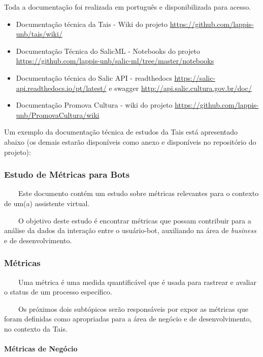 Toda a documentação foi realizada em português e disponibilizada para
acesso.

\begin{itemize}
\tightlist
\item
  Documentação técnica da Tais - Wiki do projeto
  \url{https://github.com/lappis-unb/tais/wiki/}
\item
  Documentação Técnica do SalicML - Notebooks do projeto
  \url{https://github.com/lappis-unb/salic-ml/tree/master/notebooks}
\item
  Documentação técnica do Salic API - readthedocs
  \url{https://salic-api.readthedocs.io/pt/latest/} e swagger
  \url{http://api.salic.cultura.gov.br/doc/}
\item
  Documentação Promova Cultura - wiki do projeto
  \url{https://github.com/lappis-unb/PromovaCultura/wiki}
\end{itemize}

Um exemplo da documentação técnica de estudos da Tais está apresentado
abaixo (os demais estarão disponíveis como anexo e disponíveis no
repositório do projeto):

\hypertarget{estudo-de-muxe9tricas-para-bots}{%
\subsubsection{Estudo de Métricas para
Bots}\label{estudo-de-muxe9tricas-para-bots}}

  Este documento contém um estudo sobre métricas relevantes para o
contexto de um(a) assistente virtual.

  O objetivo deste estudo é encontrar métricas que possam contribuir
para a análise da dados da interação entre o usuário-bot, auxiliando na
área de \emph{business} e de desenvolvimento.

\hypertarget{muxe9tricas}{%
\subsubsection{Métricas}\label{muxe9tricas}}

  Uma métrica é uma medida quantificável que é usada para rastrear e
avaliar o status de um processo específico.

  Os próximos dois subtópicos serão responsáveis por expor as métricas
que foram definidas como apropriadas para a área de negócio e de
desenvolvimento, no contexto da Tais.

\hypertarget{muxe9tricas-de-neguxf3cio}{%
\paragraph{Métricas de Negócio}\label{muxe9tricas-de-neguxf3cio}}


